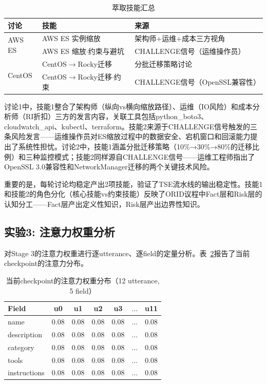 \documentclass[conference]{IEEEtran}
\begin{document}
\begin{table}[t]
\centering
\caption{萃取技能汇总}
\label{tab:skills}
\setlength{\tabcolsep}{2pt}
\renewcommand{\arraystretch}{1.1}
\begin{tabular}{lll}
\toprule
讨论 & 技能 & 来源 \\
\midrule
\multirow{2}{*}{AWS ES} & AWS ES 实例缩放 & 架构师+运维+成本三方视角 \\
& AWS ES 缩放$\cdot$约束与避坑 & CHALLENGE信号（运维操作员） \\
\midrule
\multirow{2}{*}{CentOS} & CentOS$\to$Rocky迁移 & 分批迁移策略讨论 \\
& CentOS$\to$Rocky迁移$\cdot$约束 & CHALLENGE信号（OpenSSL兼容性） \\
\bottomrule
\end{tabular}
\end{table}

讨论1中，技能1整合了架构师（纵向vs横向缩放路径）、运维（IO风险）和成本分析师（RI折扣）三方的发言内容，关联工具包括python\_boto3、cloudwatch\_api、kubectl、terraform。技能2来源于CHALLENGE信号触发的三条风险发言——运维操作员对ES缩放过程中的数据安全、宕机窗口和回滚能力提出了系统性担忧。讨论2中，技能1涵盖分批迁移策略（10\%→30\%→80\%的迁移比例）和三种监控模式；技能2同样源自CHALLENGE信号——运维工程师指出了OpenSSL 3.0兼容性和NetworkManager迁移的两个关键技术风险。

重要的是，每轮讨论均稳定产出2项技能，验证了TSE流水线的输出稳定性。技能1和技能2的角色分化（核心技能vs约束技能）反映了ORID议程中Fact层和Risk层的认知分工——Fact层产出定义性知识，Risk层产出边界性知识。

\subsection{实验3: 注意力权重分析}

对Stage 3的注意力权重进行逐utterance、逐field的定量分析。表~\ref{tab:attention}报告了当前checkpoint的注意力分布。

\begin{table}[t]
\centering
\caption{当前checkpoint的注意力权重分布（12 utterance, 5 field）}
\label{tab:attention}
\setlength{\tabcolsep}{2pt}
\begin{tabular}{lcccccc}
\toprule
Field & u0 & u1 & u2 & u3 & $\ldots$ & u11 \\
\midrule
name & 0.08 & 0.08 & 0.08 & 0.08 & $\ldots$ & 0.08 \\
description & 0.08 & 0.08 & 0.08 & 0.08 & $\ldots$ & 0.08 \\
category & 0.08 & 0.08 & 0.08 & 0.08 & $\ldots$ & 0.08 \\
tools & 0.08 & 0.08 & 0.08 & 0.08 & $\ldots$ & 0.08 \\
instructions & 0.08 & 0.08 & 0.08 & 0.08 & $\ldots$ & 0.08 \\
\bottomrule
\end{tabular}
\end{table}
\end{document}
